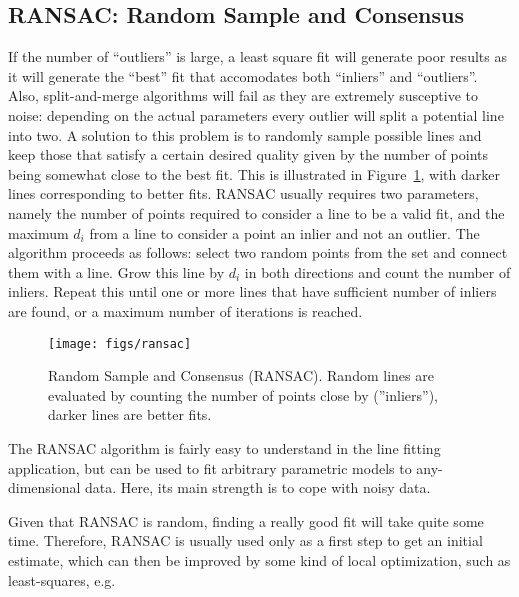 \subsection{RANSAC: Random Sample and Consensus}
If the number of ``outliers'' is large, a least square fit will generate poor results as it will generate the ``best'' fit that accomodates both ``inliers'' and ``outliers''. Also, split-and-merge algorithms will fail as they are extremely susceptive to noise: depending on the actual parameters every outlier will split a potential line into two. A solution to this problem is to randomly sample possible lines and keep those that satisfy a certain desired quality given by the number of points being somewhat close to the best fit. This is illustrated in Figure~\ref{fig:ransac}, with darker lines corresponding to better fits. RANSAC usually requires two parameters, namely the number of points required to consider a line to be a valid fit, and the maximum $d_i$ from a line to consider a point an inlier and not an outlier. The algorithm proceeds as follows: select two random points from the set and connect them with a line. Grow this line by $d_i$ in both directions and count the number of inliers. Repeat this until one or more lines that have sufficient number of inliers are found, or a maximum number of iterations is reached.

\begin{figure}
\center
\texttt{[image: figs/ransac]}
\caption{Random Sample and Consensus (RANSAC). Random lines are evaluated by counting the number of points close by (''inliers''), darker lines are better fits.\label{fig:ransac}}
\end{figure}

The RANSAC algorithm is fairly easy to understand in the line fitting application, but can be used to fit arbitrary parametric models to any-dimensional data. Here, its main strength is to cope with noisy data.

Given that RANSAC is random, finding a really good fit will take quite some time. Therefore, RANSAC is usually used only as a first step to get an initial estimate, which can then be improved by some kind of local optimization, such as least-squares, e.g.

